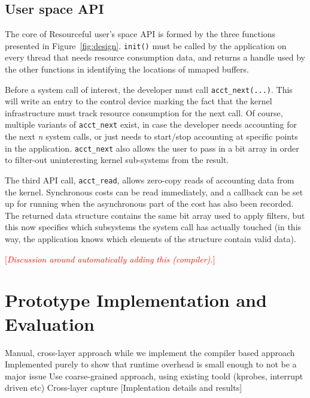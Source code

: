 \documentclass[letterpaper,twocolumn,10pt]{article}
\newcommand{\pname}{Resourceful}
\newcommand{\lnote}[1]{\textcolor{red}{[\textit{#1}]}} %
\begin{document}

\subsection{User space API}
The core of \pname{ }user's space API is formed by the three functions presented
in Figure~\ref{fig:design}. \texttt{init()} must be called by the application on
every thread that needs resource consumption data, and returns a handle used by
the other functions in identifying the locations of mmaped buffers. 

Before a system call of interest, the developer must call
\texttt{acct\_next(...)}. This will write an entry to the control device marking
the fact that the kernel infrastructure must track resource consumption for the
next call. Of course, multiple variants of \texttt{acct\_next} exist, in case
the developer needs accounting for the next \textit{n} system calls, or just
needs to start/stop accounting at specific points in the application.
\texttt{acct\_next} also allows the user to pass in a bit array in order to
filter-out uninteresting kernel sub-systems from the result.

The third API call, \texttt{acct\_read}, allows zero-copy reads of accounting
data from the kernel. Synchronous costs can be read immediately, and a callback
can be set up for running when the asynchronous part of the cost has also been
recorded. The returned data structure contains the same bit array used to apply
filters, but this now specifies which subsystems the system call has actually touched
(in this way, the application knows which elements of the structure contain valid data).

\lnote{Discussion around automatically adding this (compiler).}

\section{Prototype Implementation and Evaluation} Manual, cross-layer approach
while we implement the compiler based approach Implemented purely to show that
runtime overhead is small enough to not be a major issue Use coarse-grained
approach, using existing toold (kprobes, interrupt driven etc) Cross-layer
capture [Implentation details and results]
\end{document}
